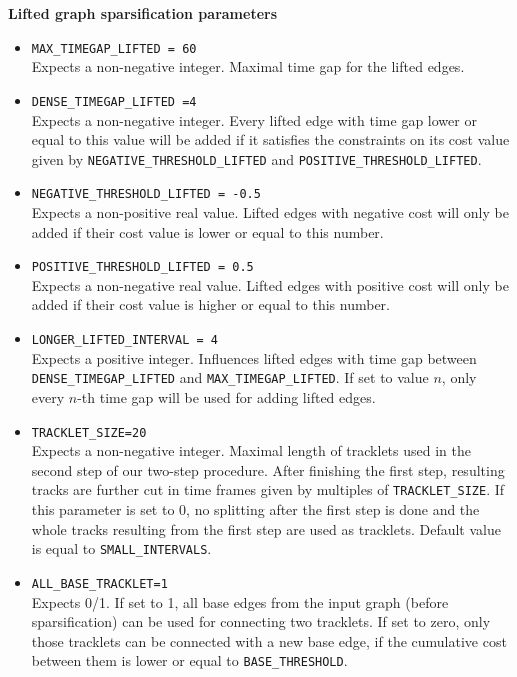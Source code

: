 \documentclass[a4paper,10pt]{article}
\begin{document}
\textbf{Lifted graph sparsification parameters}
 \begin{itemize}
 
  \item  \texttt{MAX\_TIMEGAP\_LIFTED = 60}\\
 Expects a non-negative integer. Maximal time gap for the lifted edges. 
 
 \item  \texttt{DENSE\_TIMEGAP\_LIFTED =4} \\
  Expects a non-negative integer. Every lifted edge with time gap lower or equal to this value will be added if it satisfies the constraints on its cost value given by \texttt{NEGATIVE\_THRESHOLD\_LIFTED} and \texttt{POSITIVE\_THRESHOLD\_LIFTED}.
  
 \item  \texttt{NEGATIVE\_THRESHOLD\_LIFTED = -0.5}\\
 Expects a non-positive real value. Lifted edges with negative cost will only be added if their cost value is lower or equal to this number. 
 
 \item  \texttt{POSITIVE\_THRESHOLD\_LIFTED = 0.5} \\
  Expects a non-negative real value. Lifted edges with positive cost will only be added if their cost value is higher or equal to this number. 
 
 \item  \texttt{LONGER\_LIFTED\_INTERVAL = 4}\\
Expects a positive integer. Influences lifted edges with time gap between \texttt{DENSE\_TIMEGAP\_LIFTED} and \texttt{MAX\_TIMEGAP\_LIFTED}. If set to value $n$, only every $n$-th time gap will be used for adding lifted edges. 

\item \texttt{TRACKLET\_SIZE=20}\\
Expects a non-negative integer. Maximal length of tracklets used in the second step of our two-step procedure. After finishing the first step, resulting tracks are further cut in time frames given by multiples of \texttt{TRACKLET\_SIZE}. If this parameter is set to 0, no splitting after the first step is done and the whole  tracks resulting from the first step are used as tracklets.  Default value is equal to \texttt{SMALL\_INTERVALS}.

\item \texttt{ALL\_BASE\_TRACKLET=1}\\
Expects 0/1. If set to 1, all base edges from the input graph (before sparsification) can be used for connecting two tracklets. If set to zero, only those tracklets can be connected with a new base edge, if the cumulative cost between them is lower or equal to \texttt{BASE\_THRESHOLD}.
 

\end{itemize}
\end{document}
